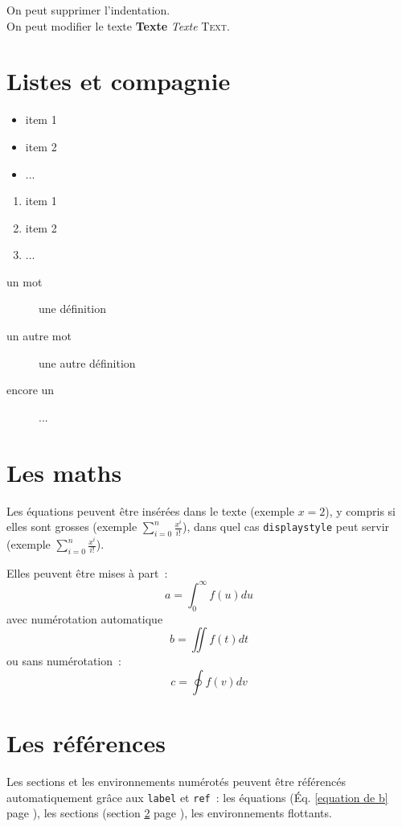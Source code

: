 \documentclass[]{article}
\begin{document}
\noindent
On peut supprimer l'indentation.\\ 
On peut modifier le texte \textbf{Texte} \textit{Texte} \textsc{Text}.

\section{Listes et compagnie}
\begin{itemize}
 \item item 1
 \item item 2
 \item ...
\end{itemize}

\begin{enumerate}
 \item item 1
 \item item 2
 \item ...
\end{enumerate}

\begin{description}
 \item[un mot] une définition 
 \item[un autre mot] une autre définition 
 \item[encore un] ... 
\end{description}

\section{Les maths}
\label{section math}
Les équations peuvent être insérées dans le texte (exemple $x=2$), 
y compris si elles sont grosses (exemple $\sum_{i=0}^n \frac{x^i}{i!}$),
dans quel cas \texttt{displaystyle} peut servir (exemple $\displaystyle \sum_{i=0}^n \frac{x^i}{i!}$).

Elles peuvent être mises à part~:
\begin{equation}
a = \int_0^\infty f(u) du
\end{equation}
avec numérotation automatique
\begin{equation} \label{equation de b}
b = \iint f(t) dt
\end{equation}
ou sans numérotation~:
\begin{equation*}
c = \oint f(v) dv
\end{equation*}

\section{Les références}
Les sections et les environnements numérotés peuvent être référencés automatiquement grâce aux \texttt{label} et \texttt{ref}~:
les équations (\'Eq. \ref{equation de b} page \pageref{equation de b}), 
les sections (section \ref{section math} page \pageref{section math}), 
les environnements flottants.
\end{document}
